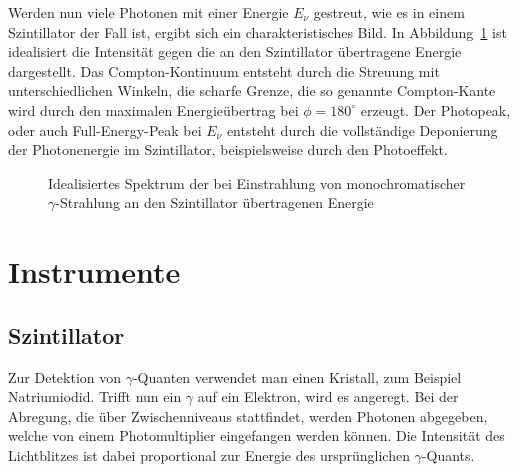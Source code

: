 Werden nun viele Photonen mit einer Energie $E_\nu$ gestreut, wie es in einem
Szintillator der Fall ist, ergibt sich ein charakteristisches Bild.
In Abbildung~\ref{fig:Compton} ist idealisiert die Intensität gegen
die an den Szintillator übertragene Energie dargestellt. Das
Compton-Kontinuum entsteht durch die Streuung mit unterschiedlichen Winkeln,
die scharfe Grenze, die so genannte Compton-Kante wird durch den maximalen
Energieübertrag bei $\phi = 180^\circ$ erzeugt. Der Photopeak, oder auch
Full-Energy-Peak bei $E_\nu$ entsteht durch die vollständige Deponierung der
Photonenergie im Szintillator, beispielsweise durch den Photoeffekt.

\begin{figure}[htbp]
    \centering
    \caption{%
        Idealisiertes Spektrum der bei Einstrahlung von monochromatischer
        $\gamma$-Strahlung an den Szintillator übertragenen Energie
    }
    \label{fig:Compton}
\end{figure}


\section{Instrumente}

\subsection{Szintillator}

Zur Detektion von $\gamma$-Quanten verwendet man einen Kristall, zum Beispiel
Natriumiodid. Trifft nun ein $\gamma$ auf ein Elektron, wird es angeregt. Bei
der Abregung, die über Zwischenniveaus stattfindet, werden Photonen abgegeben,
welche von einem Photomultiplier eingefangen werden können. Die Intensität des
Lichtblitzes ist dabei proportional zur Energie des ursprünglichen
$\gamma$-Quants.

